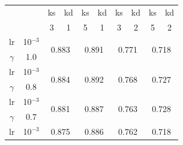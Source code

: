 \documentclass[a4paper,12pt,oneside,titlepage]{book}
\begin{document}
\begin{table}[h!]
  \centering
  \begin{tabular}{|cc||cc|cc|cc|cc|}
  \hline
  \multicolumn{2}{|c||}{\multirow{2}{*}{}}    & \multicolumn{1}{c|}{ks}         & kd        & \multicolumn{1}{c|}{ks}         & kd        & \multicolumn{1}{c|}{ks}         & kd        & \multicolumn{1}{c|}{ks}         & kd        \\ \cline{3-10} 
  \multicolumn{2}{|c||}{}                     & \multicolumn{1}{c|}{3}          & 1         & \multicolumn{1}{c|}{5}          & 1         & \multicolumn{1}{c|}{3}          & 2         & \multicolumn{1}{c|}{5}          & 2         \\ \hline\hline
  \multicolumn{1}{|c|}{lr}       & 10$^{-3}$ & \multicolumn{2}{c|}{\multirow{2}{*}{0.883}} & \multicolumn{2}{c|}{\multirow{2}{*}{0.891}} & \multicolumn{2}{c|}{\multirow{2}{*}{0.771}} & \multicolumn{2}{c|}{\multirow{2}{*}{0.718}} \\ \cline{1-2}
  \multicolumn{1}{|c|}{$\gamma$} & 1.0       & \multicolumn{2}{c|}{}                       & \multicolumn{2}{c|}{}                       & \multicolumn{2}{c|}{}                       & \multicolumn{2}{c|}{}                       \\ \hline
  \multicolumn{1}{|c|}{lr}       & 10$^{-3}$ & \multicolumn{2}{c|}{\multirow{2}{*}{0.884}} & \multicolumn{2}{c|}{\multirow{2}{*}{0.892}} & \multicolumn{2}{c|}{\multirow{2}{*}{0.768}} & \multicolumn{2}{c|}{\multirow{2}{*}{0.727}} \\ \cline{1-2}
  \multicolumn{1}{|c|}{$\gamma$} & 0.8       & \multicolumn{2}{c|}{}                       & \multicolumn{2}{c|}{}                       & \multicolumn{2}{c|}{}                       & \multicolumn{2}{c|}{}                       \\ \hline
  \multicolumn{1}{|c|}{lr}       & 10$^{-3}$ & \multicolumn{2}{c|}{\multirow{2}{*}{0.881}} & \multicolumn{2}{c|}{\multirow{2}{*}{0.887}} & \multicolumn{2}{c|}{\multirow{2}{*}{0.763}} & \multicolumn{2}{c|}{\multirow{2}{*}{0.728}} \\ \cline{1-2}
  \multicolumn{1}{|c|}{$\gamma$} & 0.7       & \multicolumn{2}{c|}{}                       & \multicolumn{2}{c|}{}                       & \multicolumn{2}{c|}{}                       & \multicolumn{2}{c|}{}                       \\ \hline
  \multicolumn{1}{|c|}{lr}       & 10$^{-3}$ & \multicolumn{2}{c|}{\multirow{2}{*}{0.875}} & \multicolumn{2}{c|}{\multirow{2}{*}{0.886}} & \multicolumn{2}{c|}{\multirow{2}{*}{0.762}} & \multicolumn{2}{c|}{\multirow{2}{*}{0.718}} \\ \cline{1-2}

\end{tabular}
\end{table}
\end{document}
